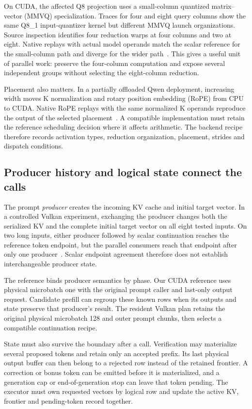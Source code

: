 On CUDA, the affected Q8 projection uses a small-column quantized matrix--vector (MMVQ) specialization. Traces for four and eight query columns show the same Q8\_1 input-quantizer kernel but different MMVQ launch organizations. Source inspection identifies four reduction warps at four columns and two at eight. Native replays with actual model operands match the scalar reference for the small-column path and diverge for the wider path~\cite{records}. This gives a useful unit of parallel work: preserve the four-column computation and expose several independent groups without selecting the eight-column reduction.

Placement also matters. In a partially offloaded Qwen deployment, increasing width moves K normalization and rotary position embedding (RoPE) from CPU to CUDA. Native RoPE replays with the same normalized K operands reproduce the output of the selected placement~\cite{records}. A compatible implementation must retain the reference scheduling decision where it affects arithmetic. The backend recipe therefore records activation types, reduction organization, placement, strides and dispatch conditions.

\subsection{Producer history and logical state connect the calls}
The prompt \emph{producer} creates the incoming KV cache and initial target vector. In a controlled Vulkan experiment, exchanging the producer changes both the serialized KV and the complete initial target vector on all eight tested inputs. On two long inputs, either producer followed by scalar continuation reaches the reference token endpoint, but the parallel consumers reach that endpoint after only one producer~\cite{records}. Scalar endpoint agreement therefore does not establish interchangeable producer state.

The reference binds producer semantics by phase. Our CUDA reference uses physical microbatch one with the original prompt caller and last-only output request. Candidate prefill can regroup these known rows when its outputs and state preserve that producer's result. The resident Vulkan plan retains the original physical microbatch 128 and outer prompt chunks, then selects a compatible continuation recipe.

State must also survive the boundary after a call. Verification may materialize several proposed tokens and retain only an accepted prefix. Its last physical output buffer can then belong to a rejected row instead of the retained frontier. A correction or bonus token can be emitted before it is materialized, and a generation cap or end-of-generation stop can leave that token pending. The executor must own requested vectors by logical row and update the active KV, frontier and pending-token record together.

